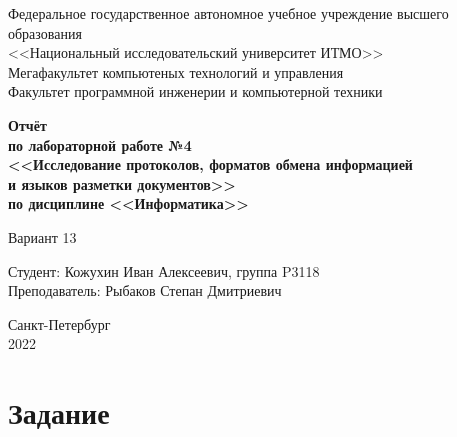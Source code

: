 \documentclass[12pt]{article}
\begin{document}
\setcounter{page}{0}
\thispagestyle{empty}

\begin{center}
    Федеральное государственное автономное учебное учреждение высшего образования\\
    <<Национальный исследовательский университет ИТМО>>\\
\vspace{0.5cm}
    Мегафакультет компьютеных технологий и управления\\
    Факультет программной инженерии и компьютерной техники
\end{center}

\vspace{3cm}

\begin{center}
\Large
\textbf{
    Отчёт\\
    по лабораторной работе №4\\
    <<Исследование протоколов, форматов обмена информацией\\
    и языков разметки документов>>\\
    по дисциплине <<Информатика>>
}
\end{center}

\begin{center}
\large
    Вариант 13
\end{center}

\vspace{6cm}

\begin{flushright}
    Студент: Кожухин Иван Алексеевич, группа P3118\\
    Преподаватель: Рыбаков Степан Дмитриевич
\end{flushright}

\vspace{6cm}

\begin{center}
    Санкт-Петербург\\
    2022
\end{center}

\newpage

\tableofcontents

\newpage

\section{Задание}
\end{document}
